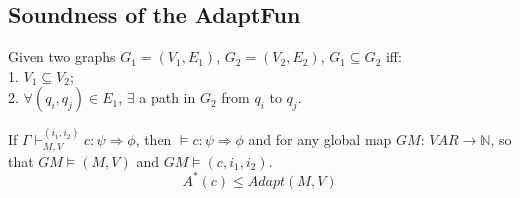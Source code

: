 \documentclass[a4paper,11pt]{article}
\newcommand{\THESYSTEM}{\textsf{AdaptFun}}
\begin{document}
\subsection{Soundness of the \THESYSTEM}
\begin{defn}
[Subgraph]
Given two graphs $G_1 = (V_1, E_1)$, $G_2 = (V_2, E_2)$, $G_1 \subseteq G_2$ iff:
\\
1. $V_1 \subseteq V_2$;
\\
2. $\forall (q_i, q_j) \in E_1$, $\exists $ a path in $G_2$ from $q_i$ to $q_j$.
\end{defn}
%
%
\begin{thm}
If $ \Gamma \vdash_{M,V}^{(i_1,i_2)} c : \psi \Rightarrow \phi$, then $\vDash c : \psi \Rightarrow \phi $ and for any global map $GM$: $VAR \to \mathbb{N} $, so that $GM \vDash (M,V)$ and $GM \vDash (c, i_1, i_2)$. 
\[
A^{*}(c) \leq Adapt(M, V)
\]      
\end{thm}
\end{document}
